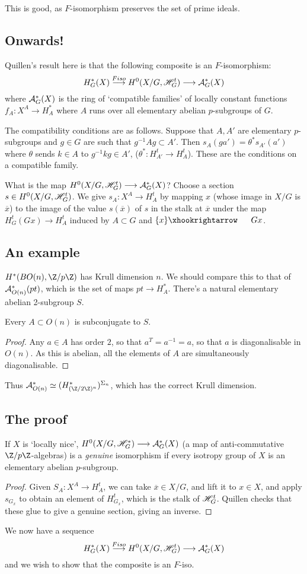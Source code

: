 \documentclass[11pt]{article}
\begin{document}
\begin{JeromyQuillen}
This is good, as $F$-isomorphism preserves the set of prime ideals.
\subsection*{Onwards!}
Quillen's result here is that the following composite is an $F$-isomorphism:
\[H^*_G(X)\overset{Fiso}{\longrightarrow} H^0(X/G,\mathscr{H}_G^t)\longrightarrow\mathcal{A}_G^*(X)\]
where $\mathcal{A}_G^*(X)$ is the ring of `compatible families' of locally constant functions $f_A:X^A\to H^*_A$ where $A$ runs over all elementary abelian $p$-subgroups of $G$.

The compatibility conditions are as follows. Suppose that $A,A'$ are elementary $p$-subgroups and $g\in G$ are such that $g^{-1}Ag\subset A'$. Then $s_A(ga')=\theta^*s_{A'}(a')$ where $\theta$ sends $k\in A$ to $g^{-1}kg\in A'$, ($\theta^*:H^t_{A'}\to H^t_A$). These are the conditions on a compatible family.

What is the map $H^0(X/G,\mathscr{H}_G^t)\longrightarrow \mathcal{A}_G^*(X)$? Choose a section $s\in H^0(X/G,\mathscr{H}_G^t)$. We give $s_A:X^A\to H_A^t$ by mapping $x$ (whose image in $X/G$ is $\overline x$) to the image of the value $s(\overline x)$ of $s$ in the stalk at $\overline x$ under the map $H^t_G(Gx)\to H^t_A$ induced by $A\subset G$ and $\{x\}\cofibration Gx$.
\subsection*{An example}
$H^*(BO(n),\Z/p\Z)$ has Krull dimension $n$. We should compare this to that of $\mathcal{A}_{O(n)}^*(pt)$, which is the set of maps $pt\to H^*_A$. There's a natural elementary abelian 2-subgroup $S$. 
\begin{claim}
Every $A\subset O(n)$ is subconjugate to $S$.
\end{claim}
\begin{proof}
Any $a\in A$ has order $2$, so that $a^T=a^{-1}=a$, so that $a$ is diagonalisable in $O(n)$. As this is abelian, all the elements of $A$ are simultaneously diagonalisable.
\end{proof}
Thus $\calA^*_{O(n)}\simeq (H^*_{(\Z/2\Z)^n})^{\Sigma_n}$, which has the correct Krull dimension.
\subsection*{The proof}
\begin{prop*}
If $X$ is `locally nice', $H^0(X/G,\mathscr{H}^*_G)\longrightarrow\mathcal{A}_G^*(X)$ (a map of anti-commutative $\Z/p\Z$-algebras) is a \emph{genuine} isomorphism if every isotropy group of $X$ is an elementary abelian $p$-subgroup.
\end{prop*}
\begin{proof}
Given $S_A:X^A\to H^t_A$, we can take $\overline x\in X/G$, and lift it to $x\in X$, and apply $s_{G_x}$ to obtain an element of $H^t_{G_x}$, which is the stalk of $\mathscr{H}^t_G$. Quillen checks that these glue to give a genuine section, giving an inverse.
\end{proof}
We now have a sequence
\[H^*_G(X)\overset{Fiso}{\longrightarrow} H^0(X/G,\mathscr{H}_G^t)\longrightarrow\mathcal{A}_G^*(X)\]
and we wish to show that the composite is an $F$-iso.


\end{JeromyQuillen}
\end{document}
